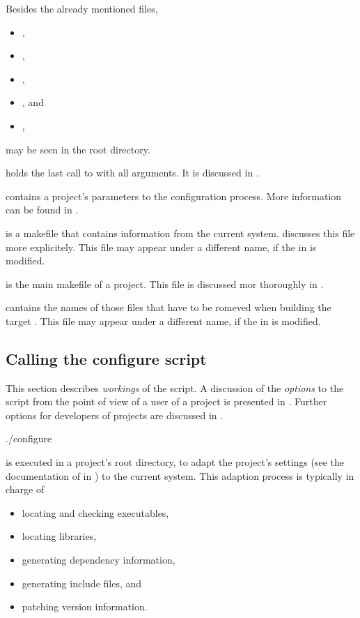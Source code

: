 Besides the already mentioned files, 
\begin{itemize}
\item {},
\item {},
\item {},
\item {}, and
\item {},
\end{itemize}
may be seen in the root directory.

 holds the last call to  with all arguments. It is discussed in .

 contains a \projectname project's parameters to the configuration process. More information can be found in .

 is a makefile that contains information from the current system.  discusses this file more explicitely. This file may appear under a different name, if the  in  is modified.

 is the main makefile of a \projectname project. This file is discussed mor thoroughly in .

 cantains the names of those files that have to be romeved when building the target . This file may appear under a different name, if the  in  is modified.

\subsection{Calling the configure script}

This section describes {\it workings} of the  script. A discussion of the {\it options} to the  script from the point of view of a user of a \projectname project is presented in . Further options for developers of \projectname projects are discussed in .

\begin{console}
./configure
\end{console}
is executed in a \projectname project's root directory, to adapt the project's settings (see the documentation of  in ) to the current system. This adaption process is typically in charge of
\begin{itemize}
\item locating and checking executables,
\item locating libraries,
\item generating dependency information,
\item generating include files, and
\item patching version information.
\end{itemize}


